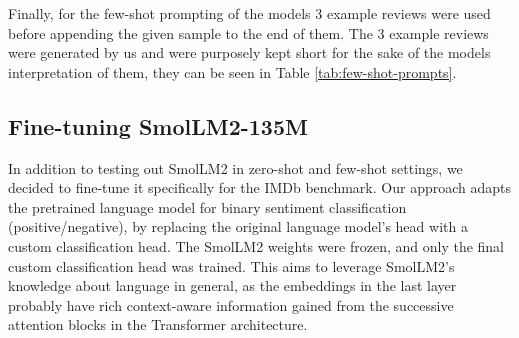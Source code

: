 \documentclass[10pt,twocolumn,letterpaper]{article}
\begin{document}
Finally, for the few-shot prompting of the models 3 example reviews were used before appending the given sample to the end of them. The 3 example reviews were generated by us and were purposely kept short for the sake of the models interpretation of them, they can be seen in Table \ref{tab:few-shot-prompts}.

\begin{table}
\begin{center}
\end{center}
\caption{Few-shot prompts used to test default SmolLM2 models.}
\label{tab:few-shot-prompts}
\end{table}




\subsection{Fine-tuning SmolLM2-135M}
\label{sec:ft_setup}

In addition to testing out SmolLM2 in zero-shot and few-shot settings, we decided to fine-tune it specifically for the IMDb benchmark. Our approach adapts the pretrained language model for binary sentiment classification (positive/negative), by replacing the original language model's head with a custom classification head. The SmolLM2 weights were frozen, and only the final custom classification head was trained.
This aims to leverage SmolLM2's knowledge about language in general, as the embeddings in the last layer probably have rich context-aware information gained from the successive attention blocks in the Transformer architecture.
\end{document}

